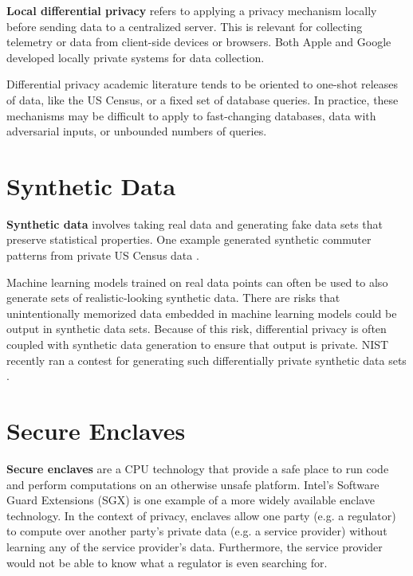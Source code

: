 \documentclass[nobib]{tufte-handout}
\begin{document}
\textbf{Local differential privacy} refers to applying a privacy mechanism
locally before sending data to a centralized server. This is relevant for
collecting telemetry or data from client-side devices or browsers. Both Apple
\cite{apple-local-differential-privacy} and Google \cite{erlingsson2014rappor}
developed locally private systems for data collection.

Differential privacy academic literature tends to be oriented to one-shot
releases of data, like the US Census, or a fixed set of database queries. In
practice, these mechanisms may be difficult to apply to fast-changing databases,
data with adversarial inputs, or unbounded numbers of queries.

\section{Synthetic Data}

\textbf{Synthetic data} involves taking real data and generating fake data sets
that preserve statistical properties. One example generated synthetic commuter
patterns from private US Census data \cite{DBLP:conf/icde/MachanavajjhalaKAGV08}.

Machine learning models trained on real data points can often be used to also
generate sets of realistic-looking synthetic data. There are risks that
unintentionally memorized data \cite{DBLP:journals/corr/abs-1802-08232} embedded
in machine learning models could be output in synthetic data sets. Because of
this risk, differential privacy is often coupled with synthetic data generation
to ensure that output is private. NIST recently ran a contest for generating
such differentially private synthetic data sets \cite{nist-synthetic-data}.

\section{Secure Enclaves}

\textbf{Secure enclaves} are a CPU technology that provide a safe place to run
code and perform computations on an otherwise unsafe platform. Intel's Software
Guard Extensions (SGX) \cite{intel-sgx} is one example of a more widely
available enclave technology. In the context of privacy, enclaves allow one
party (e.g. a regulator) to compute over another party’s private data (e.g. a
service provider) without learning any of the service provider’s data.
Furthermore, the service provider would not be able to know what a regulator is
even searching for.
\end{document}
